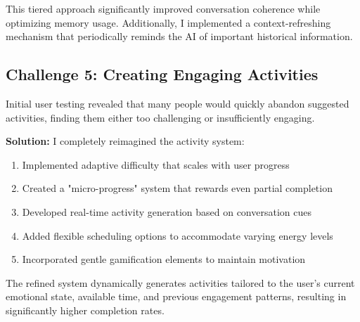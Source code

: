 \documentclass[12pt]{article}
\begin{document}
This tiered approach significantly improved conversation coherence while optimizing memory usage. Additionally, I implemented a context-refreshing mechanism that periodically reminds the AI of important historical information.

\subsection{Challenge 5: Creating Engaging Activities}

Initial user testing revealed that many people would quickly abandon suggested activities, finding them either too challenging or insufficiently engaging.

\textbf{Solution:} I completely reimagined the activity system:

\begin{enumerate}
    \item Implemented adaptive difficulty that scales with user progress
    \item Created a "micro-progress" system that rewards even partial completion
    \item Developed real-time activity generation based on conversation cues
    \item Added flexible scheduling options to accommodate varying energy levels
    \item Incorporated gentle gamification elements to maintain motivation
\end{enumerate}

The refined system dynamically generates activities tailored to the user's current emotional state, available time, and previous engagement patterns, resulting in significantly higher completion rates.
\end{document}
